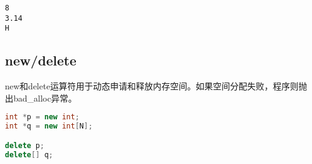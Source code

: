 \begin{tcolorbox}
	\begin{verbatim}
8
3.14
H
	\end{verbatim}
\end{tcolorbox}

\subsection{new/delete}

new和delete运算符用于动态申请和释放内存空间。如果空间分配失败，程序则抛出bad\_alloc异常。

\vspace{-0.5cm}

\begin{lstlisting}[language=C++]
int *p = new int;
int *q = new int[N];

delete p;
delete[] q;
\end{lstlisting}

\vspace{0.5cm}

\begin{table}[H]
    \centering
    \caption{new/delete与malloc()/free()的区别}
\end{table}

\newpage